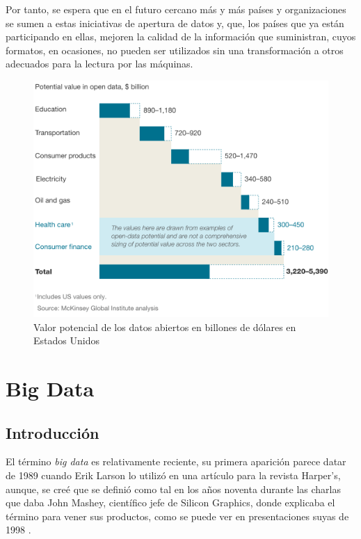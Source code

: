 Por tanto, se espera que en el futuro cercano más y más países y organizaciones se sumen a estas iniciativas de apertura de datos y, que, los países que ya están participando en ellas, mejoren la calidad de la información que suministran, cuyos formatos, en ocasiones, no pueden ser utilizados sin una transformación a otros adecuados para la lectura por las máquinas.

\begin{figure}[htp!]
\centering
\caption{Valor potencial de los datos abiertos en billones de dólares en Estados Unidos}
\label{fig:revenue}
\vspace{5pt}
\includegraphics[scale=0.8]{graphics/revenue}
\end{figure}

\newpage
\section{Big Data}
\subsection{Introducción}
El término \textit{big data} es relativamente reciente, su primera aparición parece datar de 1989 cuando Erik Larson lo utilizó en una artículo para la revista Harper's, aunque, se creé que se definió como tal en los años noventa durante las charlas que daba John Mashey, científico jefe de Silicon Graphics, donde explicaba el término para vener sus productos, como se puede ver en presentaciones suyas de 1998 \cite{originbd}.

